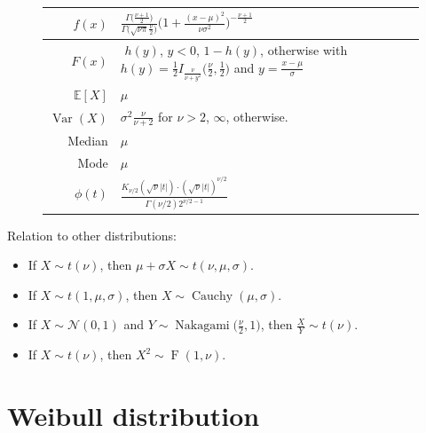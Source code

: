 \documentclass[a4paper,11pt]{article}
\theoremstyle{plain}
\theoremstyle{definition}
\newcommand{\ME}{\mathbb{E}}
\newcommand{\Var}{\operatorname{Var}}
\begin{document}
\begin{figure}[!htb]
\begin{minipage}{0.4\textwidth}
\begin{tabular}{| r | l |}
				\hline
				$f(x)$ & $\frac{\Gamma \big( \frac{\nu + 1}{2} \big)}{\Gamma \big( \sqrt{\nu \pi} \frac{\nu}{2} \big)} \big(1+\frac{(x-\mu)^2}{\nu \sigma^2} \big)^{-\frac{\nu+1}{2}}$ \\
				\hline
				$F(x)$ & \pbox{\linewidth}{$ $ \\ $h(y)$, $y < 0$, \\ $ 1 - h(y)$, otherwise \\ with $h(y)=\frac{1}{2} I_\frac{\nu}{\nu+y^2}\big(\frac{\nu}{2}, \frac{1}{2}\big)$ \\ and $y=\frac{x-\mu}{\sigma}$}\\
				\hline
				$\ME[X]$ & $\mu$ \\
				\hline
				$\Var(X)$ & \pbox{\linewidth}{$\sigma^2 \frac{\nu}{\nu+2}$ for $\nu > 2$,\\ $\infty$, otherwise.} \\
				\hline
				Median & $\mu$ \\
				\hline
				Mode & $\mu$ \\
				\hline
				$\phi(t)$ & $ \frac{K_{\nu/2}(\sqrt{\nu}|t|) \cdot (\sqrt{\nu}|t|)^{\nu/2}}{\Gamma(\nu/2)2^{\nu/2-1} } $ \\
				\hline
			\end{tabular}
		\end{minipage}
	\end{figure}
Relation to other distributions:
\begin{itemize}	
	\item If $X \sim t(\nu)$, then $\mu + \sigma X \sim t(\nu, \mu, \sigma)$. 
	\item If $X \sim t(1, \mu, \sigma)$, then $X \sim \operatorname{Cauchy}(\mu, \sigma)$.
	\item If $X \sim \mathcal{N}(0, 1)$ and $Y \sim \operatorname{Nakagami}\big(\frac{\nu}{2}, 1\big)$, then $\frac{X}{Y} \sim t(\nu)$.
	\item If $X \sim t(\nu)$, then $X^2 \sim \operatorname{F}(1, \nu)$.
\end{itemize}


\pagebreak
\section{Weibull distribution}
\end{document}
